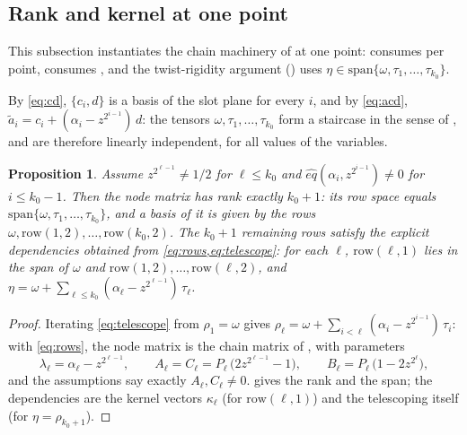 \documentclass{article}
\newtheorem{proposition}[theorem]{Proposition}
\theoremstyle{definition}
\begin{document}
\subsection{Rank and kernel at one point}\label{sec:rank}

This subsection instantiates the chain machinery of  at one point:  consumes  per point,  consumes , and the twist-rigidity argument () uses $\eta \in \mathrm{span}\{\omega, \tau_1, \dots, \tau_{k_0}\}$.

By \cref{eq:cd}, $\{c_i, d\}$ is a basis of the slot plane for every $i$, and by \cref{eq:acd}, $\tilde{a}_i = c_i + (\alpha_i - z^{2^{i-1}})\, d$: the tensors $\omega, \tau_1, \dots, \tau_{k_0}$ form a staircase in the sense of , and are therefore linearly independent, for all values of the variables.

\begin{proposition}\label{prop:rank}
Assume $z^{2^{\ell-1}} \neq 1/2$ for $\ell \le k_0$ and $\hat{eq}(\alpha_i, z^{2^{i-1}}) \neq 0$ for $i \le k_0 - 1$. Then the node matrix has rank exactly $k_0 + 1$: its row space equals $\mathrm{span}\{\omega, \tau_1, \dots, \tau_{k_0}\}$, and a basis of it is given by the rows $\omega, \mathrm{row}(1,2), \dots, \mathrm{row}(k_0, 2)$. The $k_0 + 1$ remaining rows satisfy the explicit dependencies obtained from \cref{eq:rows,eq:telescope}: for each $\ell$, $\mathrm{row}(\ell, 1)$ lies in the span of $\omega$ and $\mathrm{row}(1,2), \dots, \mathrm{row}(\ell, 2)$, and $\eta = \omega + \sum_{\ell \le k_0} (\alpha_\ell - z^{2^{\ell-1}})\, \tau_\ell$.
\end{proposition}

\begin{proof}
Iterating \cref{eq:telescope} from $\rho_1 = \omega$ gives $\rho_\ell = \omega + \sum_{i < \ell}(\alpha_i - z^{2^{i-1}})\, \tau_i$: with \cref{eq:rows}, the node matrix is the chain matrix of , with parameters
\[
\lambda_\ell = \alpha_\ell - z^{2^{\ell-1}} , \qquad A_\ell = C_\ell = P_\ell\, \big(2 z^{2^{\ell-1}} - 1\big) , \qquad B_\ell = P_\ell\, \big(1 - 2 z^{2^{\ell}}\big) ,
\]
and the assumptions say exactly $A_\ell, C_\ell \neq 0$.  gives the rank and the span; the dependencies are the kernel vectors $\kappa_\ell$ (for $\mathrm{row}(\ell, 1)$) and the telescoping itself (for $\eta = \rho_{k_0+1}$).
\end{proof}
\end{document}
